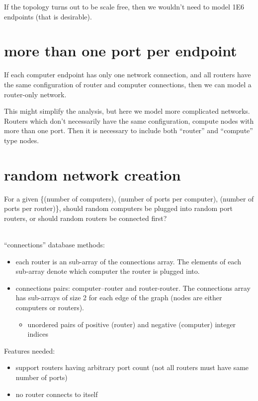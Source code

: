 \documentclass[pdftex]{article}
\begin{document}
If the topology turns out to be scale free, then we wouldn't need to model 1E6 endpoints (that is desirable).

\section{more than one port per endpoint}

If each computer endpoint has only one network connection, and all routers have the same configuration of router and computer connections, then we can model a router-only network. 

This might simplify the analysis, but here we model more complicated networks. Routers which don't necessarily have the same configuration, compute nodes with more than one port. Then it is necessary to include both ``router'' and ``compute'' type nodes.

\section{random network creation}

For a given \{(number of computers), (number of ports per computer), (number of ports per router)\}, should random computers be plugged into random port routers, or should random routers be connected first?

\ \\
``connections'' database methods:
\begin{itemize}
 \item each router is an sub-array of the connections array. The elements of each sub-array denote which computer the router is plugged into. 
 \item connections pairs: computer--router and router-router. The connections array has sub-arrays of size 2 for each edge of the graph (nodes are either computers or routers).
 \begin{itemize}
  \item unordered pairs of positive (router) and negative (computer) integer indices
 \end{itemize}

\end{itemize}
Features needed:
 \begin{itemize}
  \item support routers having arbitrary port count (not all routers must have same number of ports)
  \item no router connects to itself
 \end{itemize}
\end{document}
